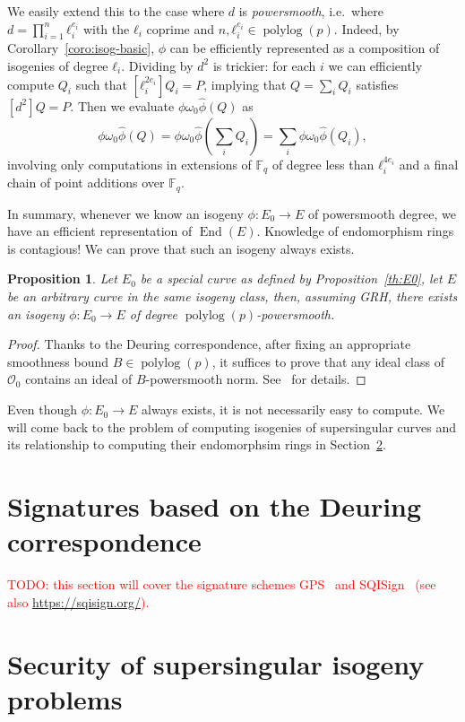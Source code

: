 \documentclass[10pt]{article}
\theoremstyle{plain}
\newtheorem{proposition}[theorem]{Proposition}
\theoremstyle{definition}
\DeclareMathOperator{\End}{End} %
\DeclareMathOperator{\polylog}{polylog}
\def\F{\ensuremath{\mathbb{F}}}
\def\O{\ensuremath{\mathcal{O}}}
\begin{document}
We easily extend this to the case where $d$ is \emph{powersmooth},
i.e.\ where $d = \prod_{i=1}^n ℓ_i^{e_i}$ with the $ℓ_i$ coprime and
$n,ℓ_i^{e_i} ∈ \polylog(p)$. %
Indeed, by Corollary~\ref{coro:isog-basic}, $ϕ$ can be efficiently
represented as a composition of isogenies of degree $ℓ_i$. %
Dividing by $d^2$ is trickier: for each $i$ we can efficiently compute
$Q_i$ such that $[ℓ_i^{2e_i}]Q_i = P$, implying that $Q = \sum_i Q_i$
satisfies $[d^2]Q = P$. %
Then we evaluate $ϕω_0\hat{ϕ}(Q)$ as
\[ϕω_0\hat{ϕ}(Q) = ϕω_0\hat{ϕ}\left(\sum_i Q_i\right) = \sum_i
  ϕω_0\hat{ϕ}(Q_i),\] %
involving only computations in extensions of $\F_q$ of degree less
than $ℓ_i^{4e_i}$ and a final chain of point additions over $\F_q$.

In summary, whenever we know an isogeny $ϕ:E_0→E$ of powersmooth
degree, we have an efficient representation of $\End(E)$. %
Knowledge of endomorphism rings is contagious! %
We can prove that such an isogeny always exists.

\begin{proposition}
  Let $E_0$ be a special curve as defined by Proposition~\ref{th:E0},
  let $E$ be an arbitrary curve in the same isogeny class, then,
  assuming GRH, there exists an isogeny $ϕ:E_0→E$ of degree
  $\polylog(p)$-powersmooth.
\end{proposition}
\begin{proof}
  Thanks to the Deuring correspondence, after fixing an appropriate
  smoothness bound $B ∈ \polylog(p)$, it suffices to prove that any
  ideal class of $\O_0$ contains an ideal of $B$-powersmooth norm. %
  See~\cite{FOCS:Wesolowski21} for details.
\end{proof}

Even though $ϕ:E_0→E$ always exists, it is not necessarily easy to
compute. %
We will come back to the problem of computing isogenies of
supersingular curves and its relationship to computing their
endomorphsim rings in Section~\ref{sec:security}.


\section{Signatures based on the Deuring correspondence}
\label{sec:sqisign}

\textcolor{red}{TODO: this section will cover the signature schemes
  GPS~\cite{JC:GalPetSil20} and SQISign~\cite{AC:DKLPW20} (see also
  \url{https://sqisign.org/}).}


\section{Security of supersingular isogeny problems}
\label{sec:security}
\end{document}
